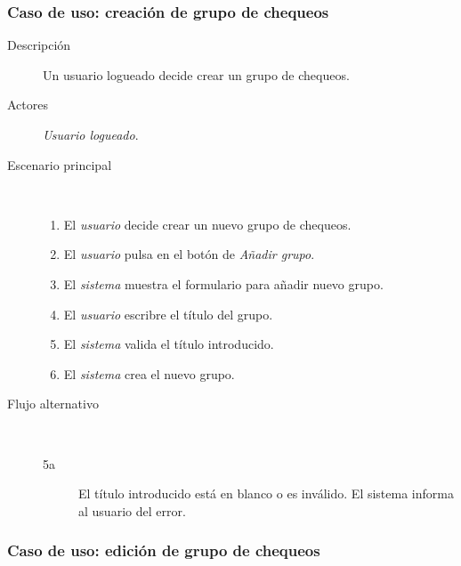 \subsubsection{Caso de uso: creación de grupo de chequeos}

\begin{description}
\item[Descripción] Un usuario logueado decide crear un grupo de chequeos.
\item[Actores] \textit{Usuario logueado}.
\item[Escenario principal] $\quad$
  \begin{enumerate}
  \item El \textit{usuario} decide crear un nuevo grupo de chequeos.
  \item El \textit{usuario} pulsa en el botón de \textit{Añadir grupo}.
  \item El \textit{sistema} muestra el formulario para añadir nuevo grupo.
  \item El \textit{usuario} escribre el título del grupo.
  \item El \textit{sistema} valida el título introducido.
  \item El \textit{sistema} crea el nuevo grupo.
  \end{enumerate}
\item[Flujo alternativo] $\quad$

  \begin{description}
  \item[5a] El título introducido está en blanco o es inválido. El sistema
    informa al usuario del error.
  \end{description}
\end{description}


\subsubsection{Caso de uso: edición de grupo de chequeos}

